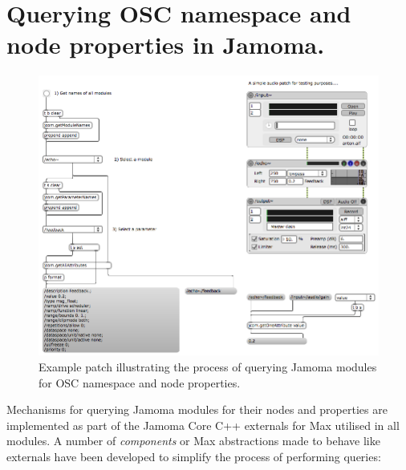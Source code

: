 \documentclass{article}
\begin{document}
%

\section{Querying OSC namespace and node properties in Jamoma.}  
 
\begin{figure}[!t] \centerline{
		\includegraphics[width=1.8\columnwidth]{SID-STSM-jamomaQuery.png}} \caption{Example patch illustrating the process of querying Jamoma modules for OSC namespace and node properties.} \label{fig:querying} 
	\end{figure}

Mechanisms for querying Jamoma modules for their nodes and properties are implemented as part of the Jamoma Core C++ externals for Max utilised in all modules. A number of \emph{components} or Max abstractions made to behave like externals have been developed to simplify the process of performing queries:
\end{document}
